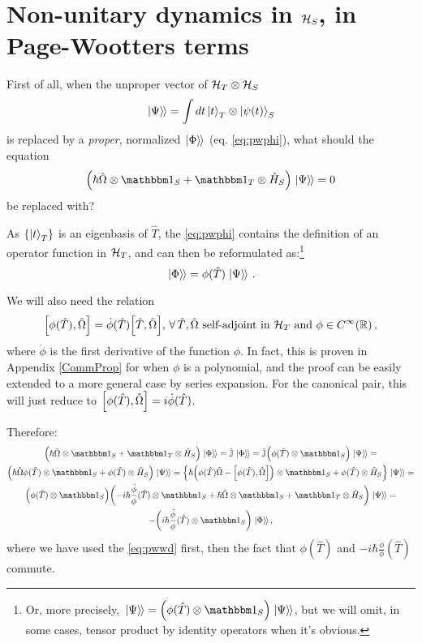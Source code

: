 \section{Non-unitary dynamics in $\mathcal{H}_S$, in Page-Wootters terms}

First of all,
when the unproper vector of $\mathcal{H}_T \otimes \mathcal{H}_S$
\begin{equation}
  \left.\left| \Psi \right\rangle\hspace{-0.115em}\right\rangle = \int dt \ket{t}_{T} \otimes \ket{\psi(t)}_{S}
\end{equation}
is replaced by a \emph{proper}, normalized $\left.\left| \Phi \right\rangle\hspace{-0.115em}\right\rangle$ (eq. \ref{eq:pwphi}),
what should the equation
\begin{equation}\label{eq:pwwd}
  \qty(\hbar\hat{\Omega} \ox \idop_S + \idop_T \ox \hat{H}_S)\dket{\Psi} = 0
\end{equation}
be replaced with?

As $\left\{\ket{t}_T\right\}$ is an eigenbasis of $\hat{T}$, the \eqref{eq:pwphi}
contains the definition of an operator function in $\mathcal{H}_T$,
and can then be reformulated as:\footnote{
  Or, more precisely, $\dket{\Psi} = \qty( \phi(\hat{T}) \ox \idop_S ) \dket{\Psi}$,
  but we will omit, in some cases,
  tensor product by identity operators
  when it's obvious.
}
\begin{equation}
  \left.\left| \Phi \right\rangle\hspace{-0.115em}\right\rangle = \phi(\hat{T})\left.\left| \Psi \right\rangle\hspace{-0.115em}\right\rangle \, \text{.}
\end{equation}

We will also need the relation
\begin{equation}
  \comm{\phi(\hat{T})}{\hat{\Omega}} = \dot{\phi}(\hat{T}) \comm{\hat{T}}{\hat{\Omega}}, \,
    \forall \, \hat{T}, \hat{\Omega} \text{ self-adjoint in } \hilb{H}_T \text{ and } \phi \in C^{\infty}(\mathbb{R}) \, \text{,} 
\end{equation}
where $\dot{\phi}$ is the first derivative of the function $\phi$.
In fact, this is proven in Appendix \ref{CommProp} for when $\phi$ is a polynomial,
and the proof can be easily extended to a more general case by series expansion.
For the canonical pair, this will just reduce to $\comm{\phi(\hat{T})}{\hat{\Omega}} = i \dot{\phi} (\hat{T})$.

Therefore:
\begin{multline}
  \qty( \hbar\hat{\Omega} \ox \idop_S + \idop_T \ox \hat{H}_S ) \dket{\Phi} =
  \hat{\mathbb{J}}\dket{\Phi} =
  \hat{\mathbb{J}} \qty( \phi(\hat{T}) \ox \idop_S) \dket{\Psi} =
  \\
  \qty( \hbar\hat{\Omega}\phi(\hat{T}) \ox \idop_S + \phi(\hat{T}) \ox \hat{H}_S )\dket{\Psi} =
  \qty{
    \hbar\qty( \phi(\hat{T})\hat{\Omega} - \comm{\phi(\hat{T})}{\hat{\Omega}} ) \ox \idop_S +
    \phi(\hat{T}) \ox \hat{H}_S
  }\dket{\Psi} =
  \\
  \qty(
    \phi(\hat{T}) \ox \idop_S
  )
  \qty(
    - i \hbar \frac{\dot{\phi}}{\phi} (\hat{T}) \ox \idop_S
    + \hbar\hat{\Omega} \ox \idop_S
    + \idop_T \ox \hat{H}_S
  ) \dket{\Psi} =
  \\
  - \qty( i \hbar \frac{\dot{\phi}}{\phi} (\hat{T}) \ox \idop_S ) \dket{\Phi}
  \text{,}
\end{multline}
where we have used the \eqref{eq:pwwd} first, then the fact that $\phi(\hat{T})$ 
and $-i\hbar\frac{\dot{\phi}}{\phi}(\hat{T})$ commute.